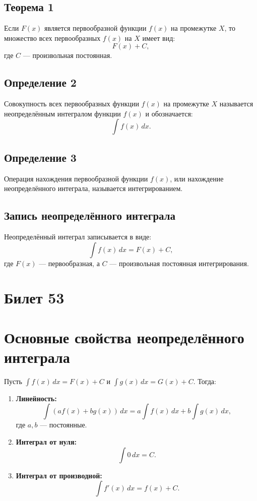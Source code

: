 \documentclass{article}
\begin{document}
\subsection*{Теорема 1}
Если \( F(x) \) является первообразной функции \( f(x) \) на промежутке \( X \), то множество всех первообразных \( f(x) \) на \( X \) имеет вид:
\[
F(x) + C,
\]
где \( C \) — произвольная постоянная.

\subsection*{Определение 2}
Совокупность всех первообразных функции \( f(x) \) на промежутке \( X \) называется неопределённым интегралом функции \( f(x) \) и обозначается:
\[
\int f(x) \, dx.
\]

\subsection*{Определение 3}
Операция нахождения первообразной функции \( f(x) \), или нахождение неопределённого интеграла, называется интегрированием.

\subsection*{Запись неопределённого интеграла}
Неопределённый интеграл записывается в виде:
\[
\int f(x) \, dx = F(x) + C,
\]
где \( F(x) \) — первообразная, а \( C \) — произвольная постоянная интегрирования.


\section{Билет 53}

\section*{Основные свойства неопределённого интеграла}
Пусть \( \int f(x) \, dx = F(x) + C \) и \( \int g(x) \, dx = G(x) + C \). Тогда:
\begin{enumerate}
    \item \textbf{Линейность:}
    \[
    \int \left( af(x) + bg(x) \right) \, dx = a \int f(x) \, dx + b \int g(x) \, dx,
    \]
    где \( a, b \) — постоянные.
    \item \textbf{Интеграл от нуля:}
    \[
    \int 0 \, dx = C.
    \]
    \item \textbf{Интеграл от производной:}
    \[
    \int f'(x) \, dx = f(x) + C.
    \]
\end{enumerate}
\end{document}
